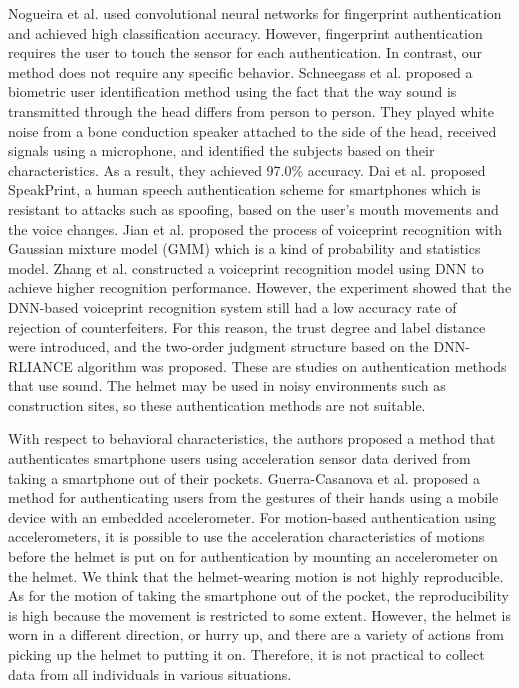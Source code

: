 \documentclass[english,preprint,JIP]{ipsj}
\begin{document}
Nogueira et al.\cite{finger_CNN} used convolutional neural networks for fingerprint authentication and achieved high classification accuracy. However, fingerprint authentication requires the user to touch the sensor for each authentication. In contrast, our method does not require any specific behavior. Schneegass et al.\cite{skull_auth} proposed a biometric user identification method using the fact that the way sound is transmitted through the head differs from person to person. They played white noise from a bone conduction speaker attached to the side of the head, received signals using a microphone, and identified the subjects based on their characteristics. As a result, they achieved 97.0\% accuracy. Dai et al.\cite{speech_auth} proposed SpeakPrint, a human speech authentication scheme for smartphones which is resistant to attacks such as spoofing, based on the user's mouth movements and the voice changes. Jian et al.\cite{voice_auth_GMM} proposed the process of voiceprint recognition with Gaussian mixture model (GMM) which is a kind of probability and statistics model. Zhang et al.\cite{voice_auth_DNN} constructed a voiceprint recognition model using DNN to achieve higher recognition performance. However, the experiment showed that the DNN-based voiceprint recognition system still had a low accuracy rate of rejection of counterfeiters. For this reason, the trust degree and label distance were introduced, and the two-order judgment structure based on the DNN-RLIANCE algorithm was proposed. These are studies on authentication methods that use sound. The helmet may be used in noisy environments such as construction sites, so these authentication methods are not suitable.\par

With respect to behavioral characteristics, the authors proposed a method that authenticates smartphone users using acceleration sensor data derived from taking a smartphone out of their pockets\cite{murao_screen_unlock_blind}. Guerra-Casanova et al.\cite{accelerometer_authentification} proposed a method for authenticating users from the gestures of their hands using a mobile device with an embedded accelerometer. For motion-based authentication using accelerometers, it is possible to use the acceleration characteristics of motions before the helmet is put on for authentication by mounting an accelerometer on the helmet. We think that the helmet-wearing motion is not highly reproducible. As for the motion of taking the smartphone out of the pocket, the reproducibility is high because the movement is restricted to some extent. However, the helmet is worn in a different direction, or hurry up, and there are a variety of actions from picking up the helmet to putting it on. Therefore, it is not practical to collect data from all individuals in various situations.
\end{document}
